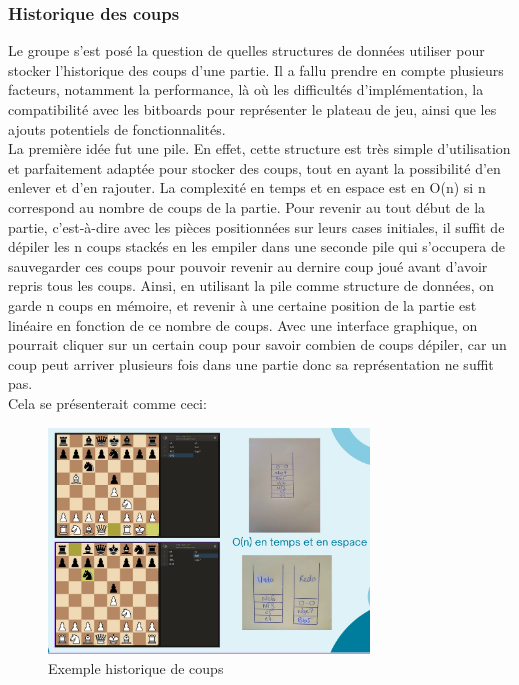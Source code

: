 \documentclass{article}
\begin{document}
\subsubsection{Historique des coups}
\par Le groupe s'est posé la question de quelles structures de données utiliser pour stocker l'historique des coups d'une
partie. Il a fallu prendre en compte plusieurs facteurs, notamment la performance, là où les difficultés d'implémentation,
la compatibilité avec les bitboards pour représenter le plateau de jeu, ainsi que les ajouts potentiels de fonctionnalités.
\\La première idée fut une pile. En effet, cette structure est très simple d'utilisation et parfaitement adaptée pour stocker
des coups, tout en ayant la possibilité d'en enlever et d'en rajouter. La complexité en temps et en espace est en O(n) si n 
correspond au nombre de coups de la partie. Pour revenir au tout début de la partie, c'est-à-dire avec les pièces positionnées
sur leurs cases initiales, il suffit de dépiler les n coups stackés en les empiler dans une seconde pile qui s'occupera de sauvegarder
ces coups pour pouvoir revenir au dernire coup joué avant d'avoir repris tous les coups. Ainsi, en utilisant la pile comme structure 
de données, on garde n coups en mémoire, et revenir à une certaine position de la partie est linéaire en fonction de ce nombre de coups.
Avec une interface graphique, on pourrait cliquer sur un certain coup pour savoir combien de coups dépiler, car un coup peut arriver
plusieurs fois dans une partie donc sa représentation ne suffit pas.\\
Cela se présenterait comme ceci:

\begin{figure}[h]
    \caption{Exemple historique de coups}
    \centering
    \includegraphics[width=\textwidth,height=6.0cm,keepaspectratio]{pile-historique-coups}
\end{figure}
\end{document}
